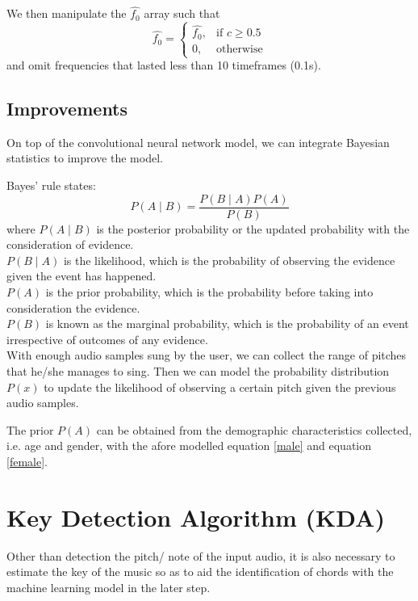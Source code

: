 We then manipulate the $\hat{f_0}$ array such that
\[\hat{f_0}= 
\begin{cases}
    \hat{f_0},		& \text{if } c\geq 0.5\\
    0,              & \text{otherwise}
\end{cases}
\label{creperesult}
\]
and omit frequencies that lasted less than 10 timeframes (0.1s).
\subsection{Improvements}

On top of the convolutional neural network model, we can integrate Bayesian statistics to improve the model.

Bayes' rule states: 
\[P(A\mid B)=\frac {P(B\mid A)P(A)}{P(B)}\]
where $P(A\mid B)$ is the posterior probability or the updated probability with the consideration of evidence.\\
$P(B\mid A)$ is the likelihood, which is the probability of observing the evidence given the event has happened.\\
$P(A)$ is the prior probability, which is the probability before taking into consideration the evidence.\\
$P(B)$ is known as the marginal probability, which is the probability of an event irrespective of outcomes of any evidence. \\

With enough audio samples sung by the user, we can collect the range of pitches that he/she manages to sing. Then we can model 
the probability distribution $P(x)$ to update the likelihood of observing a certain pitch given the previous audio samples.

The prior $P(A)$ can be obtained from the demographic characteristics collected, i.e. age and gender, with the afore modelled equation
\ref{male} and equation \ref{female}.

\section{Key Detection Algorithm (KDA)}
\label{sec:KDA}
Other than detection the pitch/ note of the input audio, it is also necessary to estimate the key of the music so as to aid the identification
of chords with the machine learning model in the later step.

